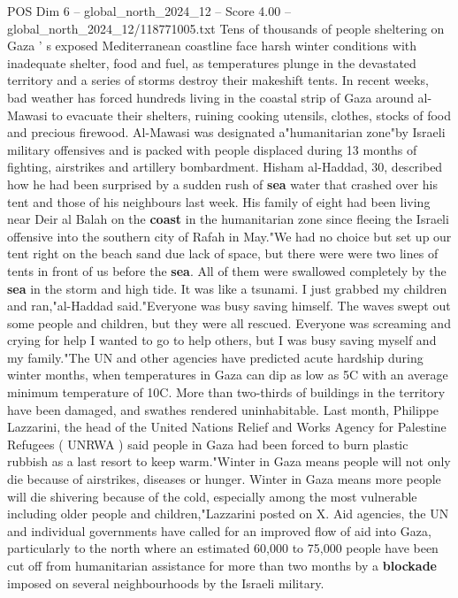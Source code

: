 \begin{textsample}{POS Dim 6 – global\_north\_2024\_12 – Score 4.00 – global\_north\_2024\_12/118771005.txt}  \label{ex:f6_pos_268}
Tens of thousands of people sheltering on Gaza ' s exposed Mediterranean coastline face harsh winter conditions with inadequate shelter, food and fuel, as temperatures plunge in the devastated territory and a series of storms destroy their makeshift tents.
In recent weeks, bad weather has forced hundreds living in the coastal strip of Gaza around al-Mawasi to evacuate their shelters, ruining cooking utensils, clothes, stocks of food and precious firewood.
Al-Mawasi was designated a"humanitarian zone"by Israeli military offensives and is packed with people displaced during 13 months of fighting, airstrikes and artillery bombardment.
Hisham al-Haddad, 30, described how he had been surprised by a sudden rush of \textbf{sea} water that crashed over his tent and those of his neighbours last week.
His family of eight had been living near Deir al Balah on the \textbf{coast} in the humanitarian zone since fleeing the Israeli offensive into the southern city of Rafah in May."We had no choice but set up our tent right on the beach sand due lack of space, but there were were two lines of tents in front of us before the \textbf{sea}.
All of them were swallowed completely by the \textbf{sea} in the storm and high tide.
It was like a tsunami.
I just grabbed my children and ran,"al-Haddad said."Everyone was busy saving himself.
The waves swept out some people and children, but they were all rescued.
Everyone was screaming and crying for help I wanted to go to help others, but I was busy saving myself and my family."The UN and other agencies have predicted acute hardship during winter months, when temperatures in Gaza can dip as low as 5C with an average minimum temperature of 10C.
More than two-thirds of buildings in the territory have been damaged, and swathes rendered uninhabitable.
Last month, Philippe Lazzarini, the head of the United Nations Relief and Works Agency for Palestine Refugees ( UNRWA ) said people in Gaza had been forced to burn plastic rubbish as a last resort to keep warm."Winter in Gaza means people will not only die because of airstrikes, diseases or hunger.
Winter in Gaza means more people will die shivering because of the cold, especially among the most vulnerable including older people and children,"Lazzarini posted on X.
Aid agencies, the UN and individual governments have called for an improved flow of aid into Gaza, particularly to the north where an estimated 60,000 to 75,000 people have been cut off from humanitarian assistance for more than two months by a \textbf{blockade} imposed on several neighbourhoods by the Israeli military.

\end{textsample}
